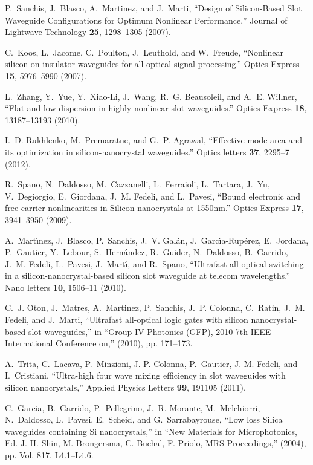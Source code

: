 \documentclass[10pt,letterpaper]{article}
\begin{document}
\begin{thebibliography}{10}
P.~Sanchis, J.~Blasco, A.~Martinez, and J.~Marti, \enquote{{Design of
  Silicon-Based Slot Waveguide Configurations for Optimum Nonlinear
  Performance},} Journal of Lightwave Technology \textbf{25}, 1298--1305
  (2007).

C.~Koos, L.~Jacome, C.~Poulton, J.~Leuthold, and W.~Freude, \enquote{{Nonlinear
  silicon-on-insulator waveguides for all-optical signal processing.}} Optics
  Express \textbf{15}, 5976--5990 (2007).

L.~Zhang, Y.~Yue, Y.~Xiao-Li, J.~Wang, R.~G. Beausoleil, and A.~E. Willner,
  \enquote{{Flat and low dispersion in highly nonlinear slot waveguides.}}
  Optics Express \textbf{18}, 13187--13193 (2010).

I.~D. Rukhlenko, M.~Premaratne, and G.~P. Agrawal, \enquote{{Effective mode
  area and its optimization in silicon-nanocrystal waveguides.}} Optics letters
  \textbf{37}, 2295--7 (2012).

R.~Spano, N.~Daldosso, M.~Cazzanelli, L.~Ferraioli, L.~Tartara, J.~Yu,
  V.~Degiorgio, E.~Giordana, J.~M. Fedeli, and L.~Pavesi, \enquote{{Bound
  electronic and free carrier nonlinearities in Silicon nanocrystals at
  1550nm.}} Optics Express \textbf{17}, 3941--3950 (2009).

A.~Mart\'{\i}nez, J.~Blasco, P.~Sanchis, J.~V. Gal\'{a}n,
  J.~Garc\'{\i}a-Rup\'{e}rez, E.~Jordana, P.~Gautier, Y.~Lebour,
  S.~Hern\'{a}ndez, R.~Guider, N.~Daldosso, B.~Garrido, J.~M. Fedeli,
  L.~Pavesi, J.~Mart\'{\i}, and R.~Spano, \enquote{{Ultrafast all-optical
  switching in a silicon-nanocrystal-based silicon slot waveguide at telecom
  wavelengths.}} Nano letters \textbf{10}, 1506--11 (2010).

C.~J. Oton, J.~Matres, A.~Martinez, P.~Sanchis, J.~P. Colonna, C.~Ratin, J.~M.
  Fedeli, and J.~Marti, \enquote{{Ultrafast all-optical logic gates with
  silicon nanocrystal-based slot waveguides},} in \enquote{Group IV Photonics
  (GFP), 2010 7th IEEE International Conference on,}  (2010), pp. 171--173.

A.~Trita, C.~Lacava, P.~Minzioni, J.-P. Colonna, P.~Gautier, J.-M. Fedeli, and
  I.~Cristiani, \enquote{{Ultra-high four wave mixing efficiency in slot
  waveguides with silicon nanocrystals},} Applied Physics Letters \textbf{99},
  191105 (2011).

C.~Garcia, B.~Garrido, P.~Pellegrino, J.~R. Morante, M.~Melchiorri,
  N.~Daldosso, L.~Pavesi, E.~Scheid, and G.~Sarrabayrouse, \enquote{{Low loss
  Silica waveguides containing Si nanocrystals},} in \enquote{New Materials for
  Microphotonics, Ed. J. H. Shin, M. Brongersma, C. Buchal, F. Priolo, MRS
  Proceedings,}  (2004), pp. Vol. 817, L4.1--L4.6.


\end{thebibliography}
\end{document}
